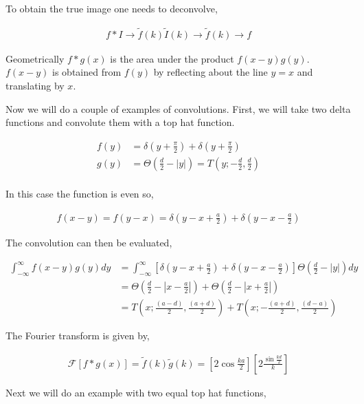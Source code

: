 \documentclass[11pt]{amsart}
\begin{document}
To obtain the true image one needs to deconvolve,

\begin{align*}
  f*I \to \tilde{f}(k) \tilde{I}(k) \to \tilde{f}(k) \to f
\end{align*}

Geometrically $f*g(x)$ is the area under the product $f(x-y) g(y)$. $f(x-y)$ is obtained from $f(y)$ by reflecting about the line $y = x$ and translating by $x$.

Now we will do a couple of examples of convolutions. First, we will take two delta functions and convolute them with a top hat function.

\begin{align*}
  f(y) &= \delta{(y + \frac{\pi}{2})} + \delta{(y + \frac{\pi}{2})} \\
  g(y) &= \Theta{(\frac{d}{2} - |y|)} = T(y; -\frac{d}{2}, \frac{d}{2}) \\
\end{align*}

In this case the function is even so,

\begin{align*}
  f(x - y) = f(y - x) = \delta\left(y - x + \frac{a}{2}\right) + \delta\left(y - x - \frac{a}{2}\right)
\end{align*}

The convolution can then be evaluated,

\begin{align*}
  \int_{-\infty}^{\infty} f(x-y)g(y)dy &= \int_{-\infty}^{\infty} \left[\delta\left(y - x + \frac{a}{2}\right) + \delta\left(y - x - \frac{a}{2}\right)\right] \Theta\left(\frac{d}{2} - |y|\right) dy \\
                                       &= \Theta\left(\frac{d}{2} - \left|x - \frac{a}{2}\right|\right) + \Theta\left(\frac{d}{2} - \left|x + \frac{a}{2}\right|\right) \\
                                       &= T\left(x; \frac{(a-d)}{2}, \frac{(a+d)}{2}\right) + T\left(x; -\frac{(a+d)}{2}, \frac{(d-a)}{2}\right)
\end{align*}

The Fourier transform is given by,

\begin{align*}
  \mathcal{F}\left[f*g(x)\right] = \tilde{f}(k)\tilde{g}(k) = \left[2\cos{\frac{ka}{2}}\right]\left[2\frac{\sin{\frac{kd}{2}}}{k}\right]
\end{align*}

Next we will do an example with two equal top hat functions,
\end{document}
